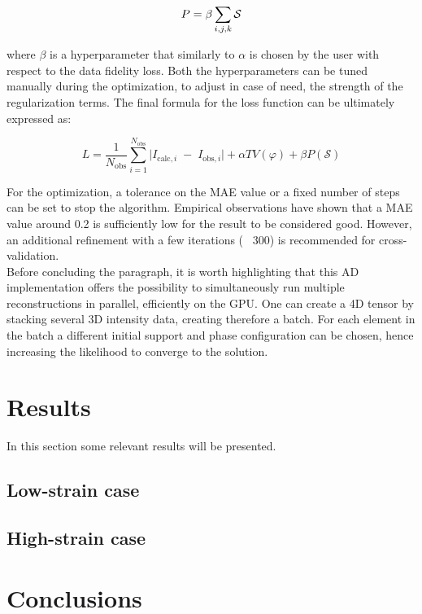 \begin{equation}
    \centering
    P = \beta  \sum_{i,j,k} \mathcal S
\end{equation}

where $\beta$ is a hyperparameter that similarly to $\alpha$ is chosen by the user with respect to the data fidelity loss. 
Both the hyperparameters can be tuned manually during the optimization, to adjust in case of need, the strength of 
the regularization terms. 
The final formula for the loss function can be ultimately expressed as: 

\begin{equation}
       L = \frac{1}{N_{\mathrm{obs}}}
       \sum_{i=1}^{N_{\mathrm{obs}}}
       \bigl\lvert I_{\mathrm{calc},i} \;-\; I_{\mathrm{obs},i}\bigr\rvert  
        + \alpha TV(\varphi)
        + \beta  P(\mathcal S)
\end{equation}

For the optimization, a tolerance on the MAE value or a fixed number of steps can be set to stop the algorithm. Empirical 
observations have shown that a MAE value around 0.2 is sufficiently low for the result to be considered good. However, 
an additional refinement with a few iterations (~ 300) is recommended for cross-validation.  \\

Before concluding the paragraph, it is worth highlighting that this AD implementation offers the possibility to simultaneously 
run multiple reconstructions in parallel, efficiently on the GPU. One can create a 4D tensor by stacking several 3D 
intensity data, creating therefore a batch. For each element in the batch a different initial support and phase configuration 
can be chosen, hence increasing the likelihood to converge to the solution. 

\section{Results}
In this section some relevant results will be presented. 





\subsection{Low-strain case}
\subsection{High-strain case}

\section{Conclusions}


